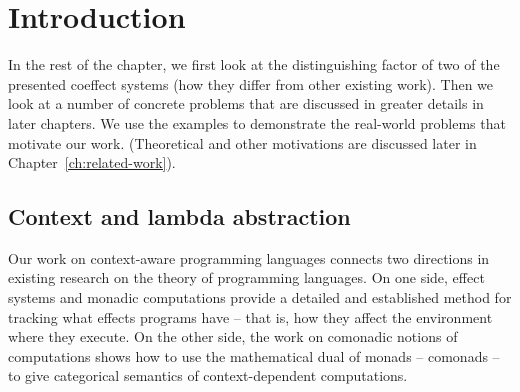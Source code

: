 \chapter{Introduction} 
\label{ch:introduction} 


In the rest of the chapter, we first look at the distinguishing factor of two of the presented
coeffect systems (how they differ from other existing work). Then we look at a number of concrete 
problems that are discussed in greater details in later chapters. We use the examples to demonstrate 
the real-world problems that motivate our work. (Theoretical and other motivations are discussed 
later in Chapter~\ref{ch:related-work}).


\section{Context and lambda abstraction}

Our work on context-aware programming languages connects two directions in existing research on the 
theory of programming languages. On one side, effect systems \cite{effects-gifford} and monadic 
computations \cite{monad-notions,monads-effects-marriage} provide a detailed and established method 
for tracking what effects programs have -- that is, how they affect the environment where they execute. 
On the other side, the work on comonadic notions of computations \cite{comonads-notions} shows how 
to use the mathematical dual of monads -- comonads -- to give categorical semantics of 
context-dependent computations.

